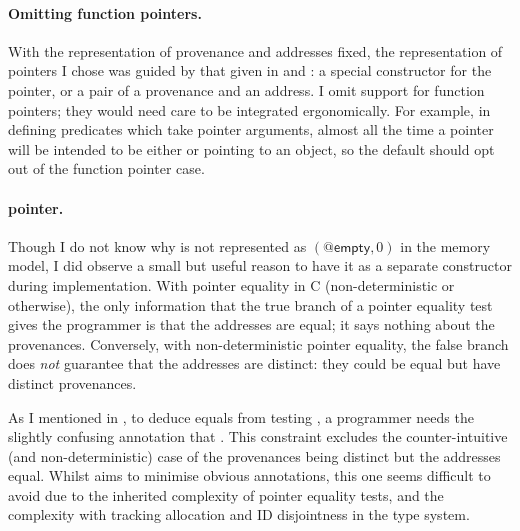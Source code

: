 \paragraph{Omitting function pointers.}%
With the representation of provenance and addresses fixed, the representation
of pointers I chose was guided by that given in  and :
a special constructor for the  pointer, or a pair of a
provenance and an address. I omit support for function pointers;
they would need care to be integrated ergonomically. For example, in defining
predicates which take pointer arguments, almost all the time a pointer will be
intended to be either  or pointing to an object, so
the default should opt out of the function pointer case.

\paragraph{ pointer.}%
Though I do not know why  is not represented as
$(@\mathsf{empty}, 0)$ in the memory model, I did observe a
small but useful reason to have it as a separate constructor during
implementation. With pointer equality in C (non-deterministic or otherwise),
the only information that the true branch of a pointer equality test gives the
programmer is that the addresses are equal; it says nothing about the
provenances. Conversely, with non-deterministic pointer equality, the false
branch does \emph{not} guarantee that the addresses are distinct: they could be
equal but have distinct provenances.

As I mentioned in , to deduce  equals
 from testing , a programmer needs the slightly
confusing annotation that . %
This constraint excludes the counter-intuitive (and non-deterministic) case of
the provenances being distinct but the addresses equal. Whilst  aims to minimise
obvious annotations, this one seems difficult to avoid due to the
inherited complexity of pointer equality tests, and the complexity with
tracking allocation and ID disjointness in the type system.

